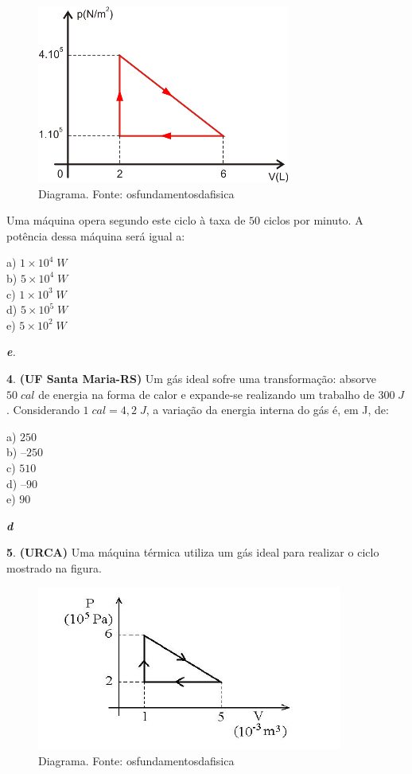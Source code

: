 \documentclass[12pt]{article}
\newenvironment{resposta*}
{\bf Resposta:\\ }
{}
\begin{document}
\begin{figure}[h]{}
\centering\includegraphics[width=2.5truein]{img18.png}
\caption{Diagrama. Fonte: osfundamentosdafisica}
\centering
\end{figure}

Uma máquina opera segundo este ciclo à taxa de $50$ ciclos por minuto. A potência dessa máquina será igual a:


a) $1\times 10^{4}\;W$ \\
b) $5\times 10^{4}\;W$ \\
c) $1\times 10^{3}\;W$ \\
d) $5\times 10^{5}\;W$ \\
e) $5\times 10^{2}\;W$


\begin{resposta*}
{\it \textbf{e}.}
\end{resposta*}

\textbf{4}. \textbf{(UF Santa Maria-RS)} Um gás ideal sofre uma transformação: absorve $50\;cal$ de energia na forma de calor e expande-se realizando um trabalho de $300\;J$. Considerando $1\;cal = 4,2\;J$, a variação da energia interna do gás é, em J, de:


a) $250$ \\
b) $–250$ \\
c) $510$ \\
d) $–90$ \\
e) $90$


\begin{resposta*}
{\it \textbf{d}}
\end{resposta*}

\textbf{5}. \textbf{(URCA)} Uma máquina térmica utiliza um gás ideal para realizar o ciclo mostrado na figura.


\begin{figure}[h]{}
\centering\includegraphics[width=2.5truein]{img19.png}
\caption{Diagrama. Fonte: osfundamentosdafisica}
\centering
\end{figure}
\end{document}
